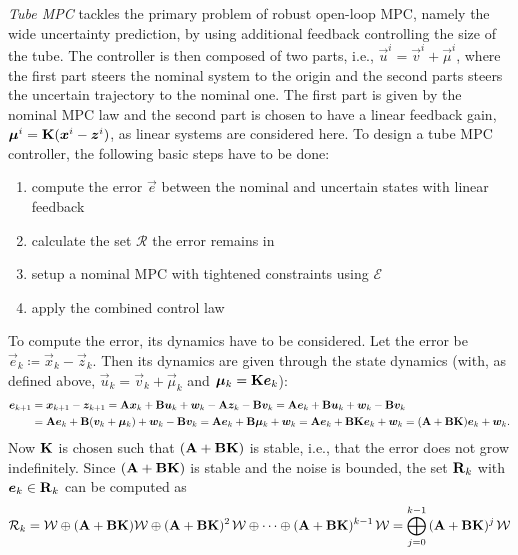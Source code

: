 		\emph{Tube MPC} tackles the primary problem of robust open-loop MPC, namely the wide uncertainty prediction, by using additional feedback controlling the size of the tube. The controller is then composed of two parts, i.e., \( \vec{u}^i = \vec{v}^i + \vec{\mu}^i \), where the first part steers the nominal system to the origin and the second parts steers the uncertain trajectory to the nominal one. The first part is given by the nominal MPC law and the second part is chosen to have a linear feedback gain, \( \bm{\mu}^i = \bm{\mathrm{K}} (\bm{x}^i - \bm{z}^i) \), as linear systems are considered here. To design a tube MPC controller, the following basic steps have to be done:
		\begin{enumerate}
			\item compute the error \( \vec{e} \) between the nominal and uncertain states with linear feedback
			\item calculate the set \(\mathcal{R}\) the error remains in
			\item setup a nominal MPC with tightened constraints using \(\mathcal{E}\)
			\item apply the combined control law
		\end{enumerate}
		To compute the error, its dynamics have to be considered. Let the error be \( \vec{e}_k \coloneqq \vec{x}_k - \vec{z}_k \). Then its dynamics are given through the state dynamics (with, as defined above, \( \vec{u}_k = \vec{v}_k + \vec{\mu}_k \) and \( \bm{\mu}_k = \bm{\mathrm{K}} \bm{e}_k \)):
		\begin{align}
			\bm{e}_{k + 1}
			 & = \bm{x}_{k + 1} - \bm{z}_{k + 1}
			= \bm{\mathrm{A}} \bm{x}_k + \bm{\mathrm{B}} \bm{u}_k + \bm{w}_k - \bm{\mathrm{A}} \bm{z}_k - \bm{\mathrm{B}} \bm{v}_k
			= \bm{\mathrm{A}} \bm{e}_k + \bm{\mathrm{B}} \bm{u}_k + \bm{w}_k - \bm{\mathrm{B}} \bm{v}_k                    \\
			 & = \bm{\mathrm{A}} \bm{e}_k + \bm{\mathrm{B}} (\bm{v}_k + \bm{\mu}_k) + \bm{w}_k - \bm{\mathrm{B}} \bm{v}_k
			= \bm{\mathrm{A}} \bm{e}_k + \bm{\mathrm{B}} \bm{\mu}_k + \bm{w}_k
			= \bm{\mathrm{A}} \bm{e}_k + \bm{\mathrm{B}} \bm{\mathrm{K}} \bm{e}_k + \bm{w}_k
			= (\bm{\mathrm{A}} + \bm{\mathrm{B}} \bm{\mathrm{K}}) \bm{e}_k + \bm{w}_k.
		\end{align}
		Now \(\bm{\mathrm{K}}\) is chosen such that \( (\bm{\mathrm{A}} + \bm{\mathrm{B}} \bm{\mathrm{K}}) \) is stable, i.e., that the error does not grow indefinitely. Since \( (\bm{\mathrm{A}} + \bm{\mathrm{B}} \bm{\mathrm{K}}) \) is stable and the noise is bounded, the set \( \bm{\mathrm{R}}_k \) with \( \bm{e}_k \in \bm{\mathrm{R}}_k \) can be computed as
		\begin{equation}
			\mathcal{R}_k
			= \mathcal{W} \oplus (\bm{\mathrm{A}} + \bm{\mathrm{B}} \bm{\mathrm{K}}) \mathcal{W} \oplus (\bm{\mathrm{A}} + \bm{\mathrm{B}} \bm{\mathrm{K}})^{2\,} \mathcal{W} \oplus \cdots \oplus (\bm{\mathrm{A}} + \bm{\mathrm{B}} \bm{\mathrm{K}})^{k - 1\,} \mathcal{W}
			= \bigoplus_{j = 0}^{k - 1}\, (\bm{\mathrm{A}} + \bm{\mathrm{B}} \bm{\mathrm{K}})^{j\,} \mathcal{W}
		\end{equation}
